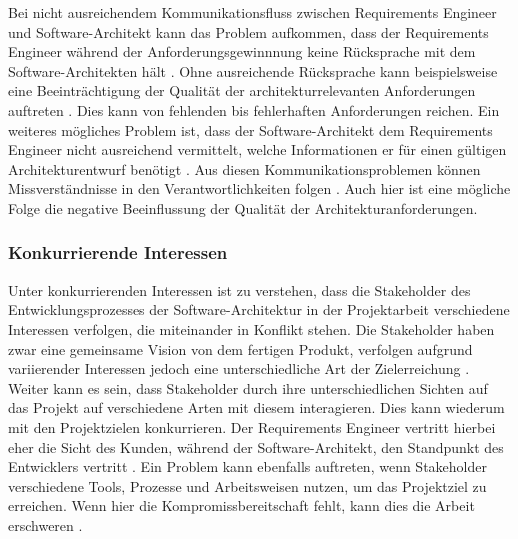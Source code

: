 Bei nicht ausreichendem Kommunikationsfluss zwischen Requirements Engineer und Software-Architekt kann das Problem aufkommen, dass der Requirements Engineer w\"ahrend der Anforderungsgewinnnung keine R\"ucksprache mit dem Software-Architekten h\"alt \cite{Her01}. Ohne ausreichende R\"ucksprache kann beispielsweise eine Beeintr\"achtigung der Qualit\"at der architekturrelevanten Anforderungen auftreten  \cite{Her01}. Dies kann von fehlenden bis fehlerhaften Anforderungen reichen. Ein weiteres m\"ogliches Problem ist, dass der Software-Architekt dem Requirements Engineer nicht ausreichend vermittelt, welche Informationen er f\"ur einen g\"ultigen Architekturentwurf ben\"otigt  \cite{Her01}. Aus diesen Kommunikationsproblemen k\"onnen Missverst\"andnisse in den Verantwortlichkeiten folgen  \cite{Her01}. Auch hier ist eine m\"ogliche Folge die negative Beeinflussung der Qualit\"at der Architekturanforderungen.\\

\subsubsection{Konkurrierende Interessen}
Unter konkurrierenden Interessen ist zu verstehen, dass die Stakeholder des Entwicklungsprozesses der Software-Architektur in der Projektarbeit verschiedene Interessen verfolgen, die miteinander in Konflikt stehen. Die Stakeholder haben zwar eine gemeinsame Vision von dem fertigen Produkt, verfolgen aufgrund variierender Interessen jedoch eine unterschiedliche Art der Zielerreichung \cite{Gru01}. Weiter kann es sein, dass Stakeholder durch ihre unterschiedlichen Sichten auf das Projekt auf verschiedene Arten mit diesem interagieren. Dies kann wiederum mit den Projektzielen konkurrieren. Der Requirements Engineer vertritt hierbei eher die Sicht des Kunden, w\"ahrend der Software-Architekt, den Standpunkt des Entwicklers vertritt \cite{DeB01}. Ein Problem kann ebenfalls auftreten, wenn Stakeholder verschiedene Tools, Prozesse und Arbeitsweisen nutzen, um das Projektziel zu erreichen. Wenn hier die Kompromissbereitschaft fehlt, kann dies die Arbeit erschweren \cite{Her01}. \\

